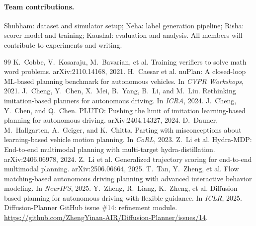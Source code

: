 \documentclass{article}
\begin{document}
\paragraph{Team contributions.}
Shubham: dataset and simulator setup; Neha: label generation pipeline; Risha: scorer model and training; Kaushal: evaluation and analysis. All members will contribute to experiments and writing.

\medskip
\small
\begin{thebibliography}{99}
 K.~Cobbe, V.~Kosaraju, M.~Bavarian, et al. Training verifiers to solve math word problems. arXiv:2110.14168, 2021.
 H.~Caesar et al. nuPlan: A closed-loop ML-based planning benchmark for autonomous vehicles. In \emph{CVPR Workshops}, 2021.
 J.~Cheng, Y.~Chen, X.~Mei, B.~Yang, B.~Li, and M.~Liu. Rethinking imitation-based planners for autonomous driving. In \emph{ICRA}, 2024.
 J.~Cheng, Y.~Chen, and Q.~Chen. PLUTO: Pushing the limit of imitation learning-based planning for autonomous driving. arXiv:2404.14327, 2024.
 D.~Dauner, M.~Hallgarten, A.~Geiger, and K.~Chitta. Parting with misconceptions about learning-based vehicle motion planning. In \emph{CoRL}, 2023.
 Z.~Li et al. Hydra-MDP: End-to-end multimodal planning with multi-target hydra-distillation. arXiv:2406.06978, 2024.
 Z.~Li et al. Generalized trajectory scoring for end-to-end multimodal planning. arXiv:2506.06664, 2025.
 T.~Tan, Y.~Zheng, et al. Flow matching-based autonomous driving planning with advanced interactive behavior modeling. In \emph{NeurIPS}, 2025.
 Y.~Zheng, R.~Liang, K.~Zheng, et al. Diffusion-based planning for autonomous driving with flexible guidance. In \emph{ICLR}, 2025.
 Diffusion-Planner GitHub issue \#14: refinement module. \url{https://github.com/ZhengYinan-AIR/Diffusion-Planner/issues/14}.
\end{thebibliography}
\end{document}
